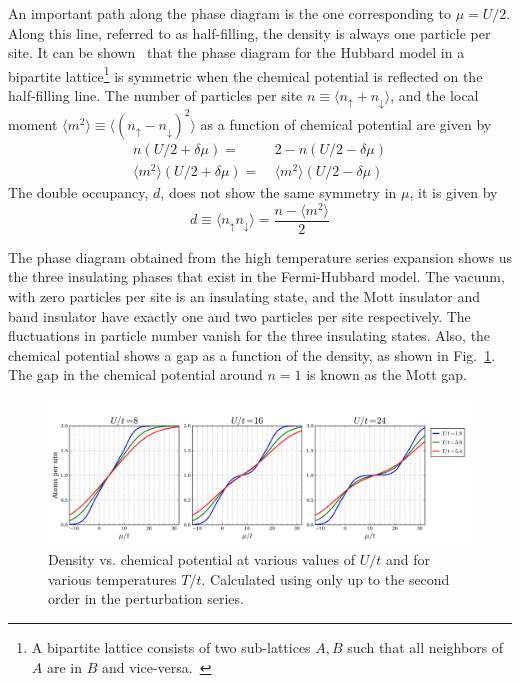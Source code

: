\documentclass[11pt,letter]{article}
\newcommand{\spup}{\ensuremath{ \uparrow }}
\newcommand{\spdn}{\ensuremath{ \downarrow}}
\begin{document}
An important path along the phase diagram is the one corresponding to $\mu =
U/2$.  Along this line, referred to as half-filling, the density is always one
particle per site.  It can be shown~\cite{Scalettar:hubbard7} that the
phase diagram for the Hubbard model in a bipartite lattice\footnote{A bipartite
lattice consists of two sub-lattices $A,B$ such that all neighbors of $A$ are
in $B$ and vice-versa.~\cite{Scalettar:hubbard7}} is symmetric when the
chemical potential is reflected on the half-filling line.  The number of
particles per site $n \equiv \langle n_{\spup} + n_{\spdn}\rangle$, and the
local moment $\langle m^{2} \rangle  \equiv \langle (n_{\spup} - n_{\spdn})^{2}
\rangle $  as a function of chemical potential are given by 
\begin{equation}
\begin{split}  
  n( U/2 + \delta\mu ) =  & \  2 - n(  U/2 - \delta\mu ) \\
  \langle m^{2} \rangle ( U/2 + \delta\mu )= & 
      \  \langle m^{2} \rangle ( U/2 -  \delta\mu )
\end{split}
\end{equation}
The double occupancy, $d$, does not show the same symmetry in $\mu$, it is given by 
\begin{equation}
  d \equiv \langle n_{\spup}n_{\spdn} \rangle =  \frac{ n - \langle m^{2} \rangle} { 2 }
\end{equation}


The phase diagram obtained from the high temperature series expansion 
shows us the three insulating phases that exist in the Fermi-Hubbard model.
The vacuum, with zero particles per site is an insulating state,  and the Mott
insulator and band insulator have exactly one and two particles per site
respectively. The fluctuations in particle number vanish for the three
insulating states.  Also, the chemical potential shows a gap as a function of
the density, as shown in Fig.~\ref{fig:HighT_insulators}.  The gap in the
chemical potential around $n=1$ is known as the Mott gap.  
\begin{figure}
\centering \includegraphics[width=\textwidth]{../HubbardPhaseDiagram_figures/HTSE_Density_U.png}
\caption[Density vs. chemical potential at various values of $U/t$]{\small
Density vs. chemical potential at various values of $U/t$ and for various
temperatures $T/t$. Calculated using only up to the second order in the
perturbation series. } \label{fig:HighT_insulators}
\end{figure}
\end{document}
